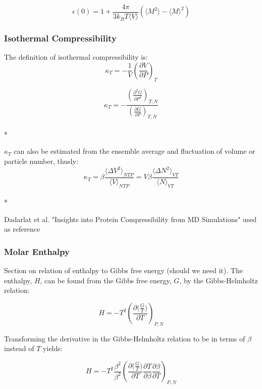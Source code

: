 \documentclass[a4paper,12pt]{article}
\begin{document}
\begin{equation} \epsilon(0) = 1 + \frac{4 \pi}{3 k_B T \langle V \rangle}(\langle M^2 \rangle - \langle M \rangle^2) \end{equation}


\subsubsection{Isothermal Compressibility}
\noindent The definition of isothermal compressibility is:
\begin{equation}\kappa_T = -\frac{1}{V} \left(\frac{\partial V}{\partial P}\right)_T \end{equation}

\begin{equation}\kappa_T = -\frac{\left(\frac{\partial^2 G}{\partial P^2}\right)_{T, N}}{\left(\frac{\partial G}{\partial P}\right)_{T, N}}\end{equation}\\*

\noindent $\kappa_T$ can also be estimated from the ensemble average and fluctuation of volume or particle number, thusly:
\begin{equation}\kappa_T = \beta \frac{\langle \Delta V^2 \rangle_{NTP}}{\langle V \rangle_{NTP}} = V \beta \frac{\langle \Delta N^2 \rangle_{VT}}{\langle N \rangle_{VT}}\end{equation}\\*

\noindent Dadarlat et al. "Insights into Protein Compressibility from MD Simulations" used as reference

\subsubsection{Molar Enthalpy}
\noindent Section on relation of enthalpy to Gibbs free energy (should we need it).
\noindent The enthalpy, $H$, can be found from the Gibbs free energy, $G$, by the Gibbs-Helmholtz relation: 

\begin{equation}H=-T^2 \left(\frac{\partial \big(\frac{G}{T}\big)}{\partial T}\right)_{P,N}\end{equation}

\noindent Transforming the derivative in the Gibbs-Helmholtz relation to be in terms of $\beta$ instead of $T$ yields:

\begin{equation}H=-T^2  \frac{\beta^2}{\beta^2}\left(\frac{\partial \big(\frac{G}{T}\big)}{\partial T} \frac{\partial T}{\partial \beta} \frac{\partial \beta}{\partial T}\right)_{P,N}\end{equation}
\end{document}
